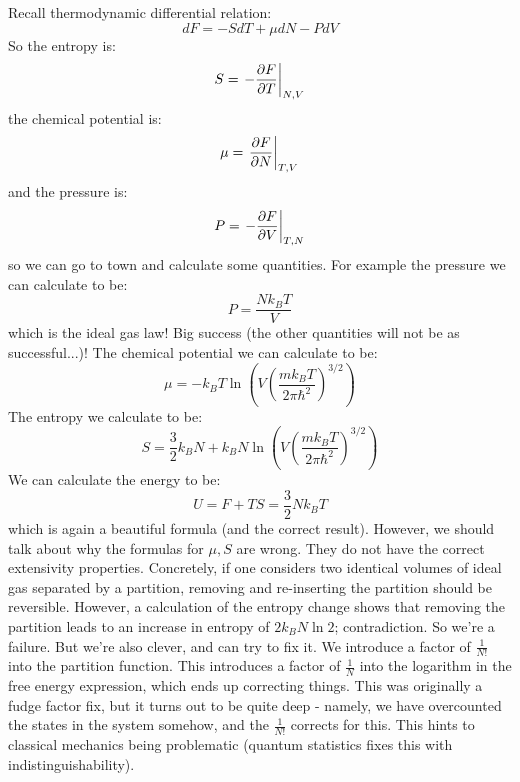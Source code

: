 Recall thermodynamic differential relation:
\begin{equation}
    dF = -S dT + \mu dN - P dV
\end{equation}
So the entropy is:
\begin{equation}
    S = \left.-\frac{\partial F}{\partial T}\right|_{N, V}
\end{equation}
the chemical potential is:
\begin{equation}
    \mu = \left.\frac{\partial F}{\partial N}\right|_{T, V}
\end{equation}
and the pressure is:
\begin{equation}
    P = \left.-\frac{\partial F}{\partial V}\right|_{T, N}
\end{equation}
so we can go to town and calculate some quantities. For example
the pressure we can calculate to be:
\begin{equation}
    P = \frac{N k_B T}{V}
\end{equation}
which is the ideal gas law! Big success (the other quantities will not be as successful...)! The chemical potential we can calculate to be:
\begin{equation}
    \mu = -k_B T\ln\left(V\left(\frac{mk_B T}{2\pi \hbar^2}\right)^{3/2}\right)
\end{equation}
The entropy we calculate to be:
\begin{equation}
    S = \frac{3}{2}k_B N + k_B N\ln\left(V\left(\frac{m k_B T}{2\pi \hbar^2}\right)^{3/2}\right)
\end{equation}
We can calculate the energy to be:
\begin{equation}
    U = F + TS = \frac{3}{2}N k_B T
\end{equation}
which is again a beautiful formula (and the correct result). However, we should talk about why the formulas for $\mu, S$ are wrong. They do not have the correct extensivity properties. Concretely, if one considers two identical volumes of ideal gas separated by a partition, removing and re-inserting the partition should be reversible. However, a calculation of the entropy change shows that removing the partition leads to an increase in entropy of $2k_B N \ln 2$; contradiction. So we're a failure. But we're also clever, and can try to fix it. We introduce a factor of $\frac{1}{N!}$ into the partition function. This introduces a factor of $\frac{1}{N}$ into the logarithm in the free energy expression, which ends up correcting things. This was originally a fudge factor fix, but it turns out to be quite deep - namely, we have overcounted the states in the system somehow, and the $\frac{1}{N!}$ corrects for this. This hints to classical mechanics being problematic (quantum statistics fixes this with indistinguishability). 

